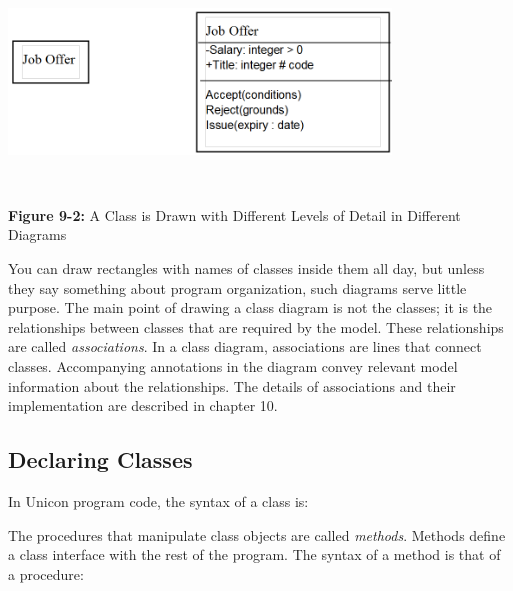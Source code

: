 \bigskip

\includegraphics[width=4in,height=2.2in]{ub-img/lodetail.png} 

{\sffamily\bfseries Figure 9-2:}
{\sffamily A Class is Drawn with Different Levels of Detail in
 Different Diagrams}

\bigskip

You can draw rectangles with names of classes inside them all day, but
unless they say something about program organization, such diagrams
serve little purpose. The main point of drawing a class diagram is not
the classes; it is the relationships between classes that are required
by the model. These relationships are called
\textit{associations}. In a class diagram,
associations are lines that connect classes. Accompanying annotations
in the diagram convey relevant model information about the
relationships. The details of associations and their implementation are
described in chapter 10.

\subsection[Declaring Classes]{Declaring Classes}
In Unicon program code, the syntax of a class
is: 


The procedures that manipulate class objects are called
\textit{methods}. Methods define a
class{\textquotesingle} interface with the rest of the program. The
syntax of a method is that of a procedure: 


